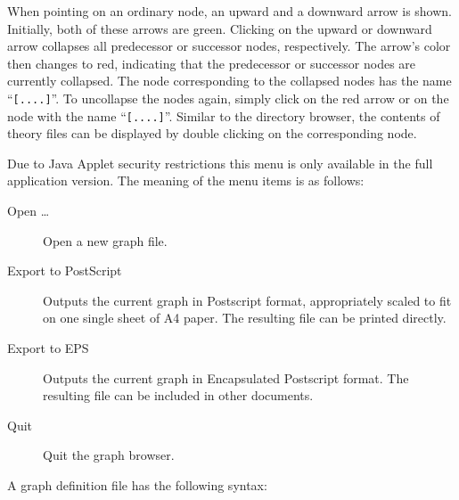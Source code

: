 \begin{isabellebody}
\begin{isamarkuptext}
\begin{itemize}
  \end{itemize}%
\end{isamarkuptext}%
\isamarkuptrue%
%
\isamarkuptrue%
%
\begin{isamarkuptext}%
When pointing on an ordinary node, an upward and a downward arrow is
  shown.  Initially, both of these arrows are green. Clicking on the
  upward or downward arrow collapses all predecessor or successor
  nodes, respectively. The arrow's color then changes to red,
  indicating that the predecessor or successor nodes are currently
  collapsed. The node corresponding to the collapsed nodes has the
  name ``\verb|[....]|''. To uncollapse the nodes again, simply
  click on the red arrow or on the node with the name ``\verb|[....]|''. Similar to the directory browser, the contents of
  theory files can be displayed by double clicking on the
  corresponding node.%
\end{isamarkuptext}%
\isamarkuptrue%
%
\isamarkuptrue%
%
\begin{isamarkuptext}%
Due to Java Applet security restrictions this menu is only available
  in the full application version. The meaning of the menu items is as
  follows:

  \begin{description}

  \item[Open \dots] Open a new graph file.

  \item[Export to PostScript] Outputs the current graph in Postscript
  format, appropriately scaled to fit on one single sheet of A4 paper.
  The resulting file can be printed directly.

  \item[Export to EPS] Outputs the current graph in Encapsulated
  Postscript format. The resulting file can be included in other
  documents.

  \item[Quit] Quit the graph browser.

  \end{description}%
\end{isamarkuptext}%
\isamarkuptrue%
%
\isamarkuptrue%
%
\begin{isamarkuptext}%
A graph definition file has the following syntax:


\end{isamarkuptext}
\end{isabellebody}
